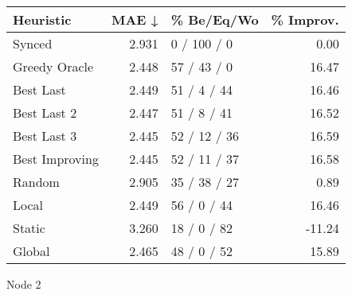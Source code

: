 \begin{tabular}{lrlr}
\toprule
\textbf{Heuristic} & \textbf{MAE ↓} & \textbf{\% Be/Eq/Wo} & \textbf{\% Improv.} \\
\midrule
            Synced &          2.931 &          0 / 100 / 0 &                0.00 \\
     Greedy Oracle &          2.448 &          57 / 43 / 0 &               16.47 \\
         Best Last &          2.449 &          51 / 4 / 44 &               16.46 \\
       Best Last 2 &          2.447 &          51 / 8 / 41 &               16.52 \\
       Best Last 3 &          2.445 &         52 / 12 / 36 &               16.59 \\
    Best Improving &          2.445 &         52 / 11 / 37 &               16.58 \\
            Random &          2.905 &         35 / 38 / 27 &                0.89 \\
             Local &          2.449 &          56 / 0 / 44 &               16.46 \\
            Static &          3.260 &          18 / 0 / 82 &              -11.24 \\
            Global &          2.465 &          48 / 0 / 52 &               15.89 \\
\bottomrule
\end{tabular}
\caption{Node 2}
\label{tab:ds_iid_lr05_le1_bs4_2}
